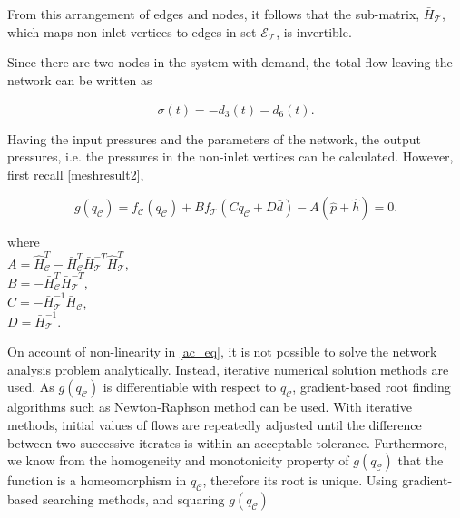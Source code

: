 From this arrangement of edges and nodes, it follows that the sub-matrix, $\bar{H}_{\mathcal{T}}$, which maps non-inlet vertices to edges in set $\mathcal{E}_{\mathcal{T}}$, is invertible. 

Since there are two nodes in the system with demand, the total flow leaving the network can be written as

\begin{equation}
  \label{consumption1}
  \sigma(t) = -\bar{d}_3(t) - \bar{d}_6(t).
\end{equation}

Having the input pressures and the parameters of the network, the output pressures, i.e. the pressures in the non-inlet vertices can be calculated. However, first recall \eqref{meshresult2}, 

\begin{equation}
  \label{ac_eq} 
  g(q_{\mathcal{C}}) = f_{\mathcal{C}}(q_\mathcal{C}) + B f_{\mathcal{T}}(C q_\mathcal{C} + D \bar{d}) - A(\hat{p} + \hat{h}) = 0.
\end{equation}

\begin{minipage}[t]{0.4\textwidth}
where\\
\hspace*{8mm} $A = \hat{H}^T_{\mathcal{C}} -\bar{H}^T_{\mathcal{C}}\bar{H}^{-T}_{\mathcal{T}}\hat{H}^T_{\mathcal{T}}$, \vspace*{1.5mm}  \\
\hspace*{8mm} $B = -\bar{H}^T_{\mathcal{C}}\bar{H}^{-T}_{\mathcal{T}}$, \vspace*{1.5mm}  \\
\hspace*{8mm} $C = -\bar{H}^{-1}_{\mathcal{T}} \bar{H}_{\mathcal{C}} $, \vspace*{1.5mm}\\
\hspace*{8mm} $D = \bar{H}^{-1}_{\mathcal{T}}$. 
\end{minipage}

On account of non-linearity in \eqref{ac_eq},  it is not possible to solve the network analysis problem analytically. Instead, iterative numerical solution methods are used. As $g(q_{\mathcal{C}})$ is differentiable with respect to $q_{\mathcal{C}}$, gradient-based root finding algorithms such as Newton-Raphson method can be used. With iterative methods, initial values of flows are repeatedly adjusted until the difference between two successive iterates is within an acceptable tolerance.  Furthermore, we know from the homogeneity and monotonicity property of $g(q_{\mathcal{C}})$ that the function is a homeomorphism in $q_{\mathcal{C}}$, therefore its root is unique. Using gradient-based searching methods, and squaring $g(q_{\mathcal{C}})$ 

